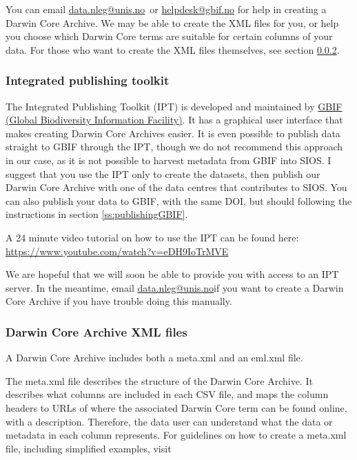 \documentclass[a4paper,english, 11pt]{article}
\makeatletter
\newcommand{\emailme}{\href{mailto:data.nleg@unis.no}{data.nleg@unis.no}}
\makeatother
\begin{document}
You can email \emailme \ or \href{mailto:helpdesk@gbif.no}{helpdesk@gbif.no} for help in creating a Darwin Core Archive. We may be able to create the XML files for you, or help you choose which Darwin Core terms are suitable for certain columns of your data. For those who want to create the XML files themselves, see section \ref{ss:xml}.

\subsubsection{Integrated publishing toolkit}
\label{ss:ipt}

The Integrated Publishing Toolkit (IPT) is developed and maintained by \href{https://www.gbif.org/}{GBIF (Global Biodiversity Information Facility)}. It has a graphical user interface that makes creating Darwin Core Archives easier. It is even possible to publish data straight to GBIF through the IPT, though we do not recommend this approach in our case, as it is not possible to harvest metadata from GBIF into SIOS. I suggest that you use the IPT only to create the datasets, then publish our Darwin Core Archive with one of the data centres that contributes to SIOS. You can also publish your data to GBIF, with the same DOI, but should following the instructions in section \ref{ss:publishingGBIF}. 

A 24 minute video tutorial on how to use the IPT can be found here:\\ 
\url{https://www.youtube.com/watch?v=eDH9IoTrMVE}

We are hopeful that we will soon be able to provide you with access to an IPT server. In the meantime, email \emailme if you want to create a Darwin Core Archive if you have trouble doing this manually.

\subsubsection{Darwin Core Archive XML files}
\label{ss:xml}

A Darwin Core Archive includes both a meta.xml and an eml.xml file.

The meta.xml file describes the structure of the Darwin Core Archive. It describes what columns are included in each CSV file, and maps the column headers to URLs of where the associated Darwin Core term can be found online, with a description. Therefore, the data user can understand what the data or metadata in each column represents. For guidelines on how to create a meta.xml file, including simplified examples, visit
\end{document}
